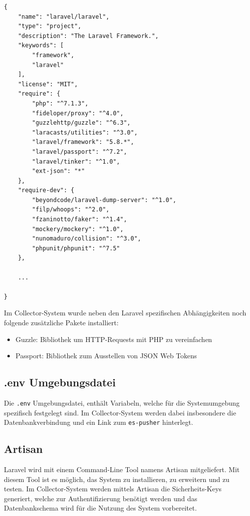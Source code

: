         \begin{lstlisting}[caption={Ausschnitt composer.json für das Collector-System}]
{
    "name": "laravel/laravel",
    "type": "project",
    "description": "The Laravel Framework.",
    "keywords": [
        "framework",
        "laravel"
    ],
    "license": "MIT",
    "require": {
        "php": "^7.1.3",
        "fideloper/proxy": "^4.0",
        "guzzlehttp/guzzle": "^6.3",
        "laracasts/utilities": "^3.0",
        "laravel/framework": "5.8.*",
        "laravel/passport": "^7.2",
        "laravel/tinker": "^1.0",
        "ext-json": "*"
    },
    "require-dev": {
        "beyondcode/laravel-dump-server": "^1.0",
        "filp/whoops": "^2.0",
        "fzaninotto/faker": "^1.4",
        "mockery/mockery": "^1.0",
        "nunomaduro/collision": "^3.0",
        "phpunit/phpunit": "^7.5"
    },
    
    ...
    
}
     \end{lstlisting}
     
     Im Collector-System wurde neben den Laravel spezifischen Abhängigkeiten noch folgende zusätzliche Pakete installiert:
        
        \begin{itemize}
            \item Guzzle: Bibliothek um HTTP-Requests mit PHP zu vereinfachen
            \item Passport: Bibliothek zum Ausstellen von JSON Web Tokens
        \end{itemize}
    
    \subsection{.env Umgebungsdatei}
        Die \texttt{.env} Umgebungsdatei, enthält Variabeln, welche für die Systemumgebung spezifisch festgelegt sind. Im Collector-System werden dabei insbesondere die Datenbankverbindung und ein Link zum \texttt{es-pusher} hinterlegt.
        
    \subsection{Artisan}
        Laravel wird mit einem Command-Line Tool namens Artisan mitgeliefert. Mit diesem Tool ist es möglich, das System zu installieren, zu erweitern und zu testen. Im Collector-System werden mittels Artisan die Sicherheits-Keys generiert, welche zur Authentifizierung benötigt werden und das Datenbankschema wird für die Nutzung des System vorbereitet.
        
